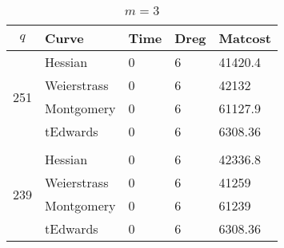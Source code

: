 
\begin{table}[!h]
\centering
\caption{$m=3$}
\label{tb:m=3}
\begin{tabular}{lllll}
\hline
\multicolumn{1}{|c|}{$q$}                    & \multicolumn{1}{l|}{Curve}       & \multicolumn{1}{l|}{Time} & \multicolumn{1}{l|}{Dreg} & \multicolumn{1}{l|}{Matcost} \\ \hline
\multicolumn{1}{|l|}{\multirow{4}{*}{251}} & \multicolumn{1}{l|}{Hessian}     & \multicolumn{1}{l|}{0}    & \multicolumn{1}{l|}{6}    & \multicolumn{1}{l|}{41420.4} \\ \cline{2-5} 
\multicolumn{1}{|l|}{}                     & \multicolumn{1}{l|}{Weierstrass} & \multicolumn{1}{l|}{0}    & \multicolumn{1}{l|}{6}    & \multicolumn{1}{l|}{42132}   \\ \cline{2-5} 
\multicolumn{1}{|l|}{}                     & \multicolumn{1}{l|}{Montgomery}  & \multicolumn{1}{l|}{0}    & \multicolumn{1}{l|}{6}    & \multicolumn{1}{l|}{61127.9} \\ \cline{2-5} 
\multicolumn{1}{|l|}{}                     & \multicolumn{1}{l|}{tEdwards}    & \multicolumn{1}{l|}{0}    & \multicolumn{1}{l|}{6}    & \multicolumn{1}{l|}{6308.36} \\ \hline \vspace{-3mm}
                                           &                                  &                           &                           &                              \\ \hline
\multicolumn{1}{|l|}{\multirow{4}{*}{239}} & \multicolumn{1}{l|}{Hessian}     & \multicolumn{1}{l|}{0}    & \multicolumn{1}{l|}{6}    & \multicolumn{1}{l|}{42336.8} \\ \cline{2-5} 
\multicolumn{1}{|l|}{}                     & \multicolumn{1}{l|}{Weierstrass} & \multicolumn{1}{l|}{0}    & \multicolumn{1}{l|}{6}    & \multicolumn{1}{l|}{41259}   \\ \cline{2-5} 
\multicolumn{1}{|l|}{}                     & \multicolumn{1}{l|}{Montgomery}  & \multicolumn{1}{l|}{0}    & \multicolumn{1}{l|}{6}    & \multicolumn{1}{l|}{61239}   \\ \cline{2-5} 
\multicolumn{1}{|l|}{}                     & \multicolumn{1}{l|}{tEdwards}    & \multicolumn{1}{l|}{0}    & \multicolumn{1}{l|}{6}    & \multicolumn{1}{l|}{6308.36} \\ \hline
\end{tabular}
\end{table}


